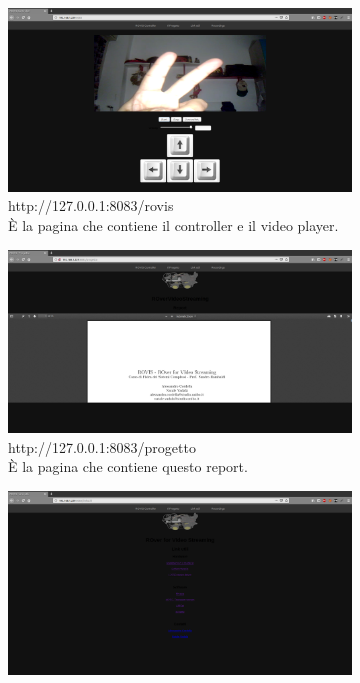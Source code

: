 \documentclass[11pt]{article}
\begin{document}
\begin{figure}[htp]
	\centering
	\begin{subfigure}[b]{0.5\textwidth}
		\includegraphics[width=\textwidth]{images/page-rovis.png}
		\caption{http://127.0.0.1:8083/rovis\\È la pagina che contiene il controller e il video player.}
		\label{fig:page-rovis}
	\end{subfigure}
	\begin{subfigure}[b]{0.5\textwidth}
		\includegraphics[width=\textwidth]{images/page-proj.png}
		\caption{http://127.0.0.1:8083/progetto\\È la pagina che contiene questo report.}
		\label{fig:page-project}
	\end{subfigure}
	\begin{subfigure}[b]{0.5\textwidth}
		\includegraphics[width=\textwidth]{images/page-link.png}

\end{subfigure}
\end{figure}
\end{document}
